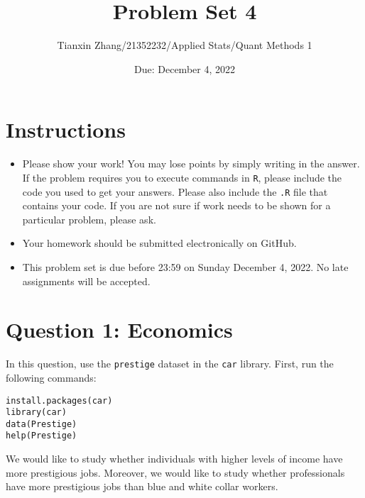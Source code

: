 \documentclass[12pt,letterpaper]{article}
\title{Problem Set 4}
\date{Due: December 4, 2022}
\author{Tianxin Zhang/21352232/Applied Stats/Quant Methods 1}
\begin{document}
	\maketitle
	\section*{Instructions}
	\begin{itemize}
		\item Please show your work! You may lose points by simply writing in the answer. If the problem requires you to execute commands in \texttt{R}, please include the code you used to get your answers. Please also include the \texttt{.R} file that contains your code. If you are not sure if work needs to be shown for a particular problem, please ask.
		\item Your homework should be submitted electronically on GitHub.
		\item This problem set is due before 23:59 on Sunday December 4, 2022. No late assignments will be accepted.
	\end{itemize}



	\vspace{.5cm}
\section*{Question 1: Economics}
\vspace{.25cm}
\noindent 	
In this question, use the \texttt{prestige} dataset in the \texttt{car} library. First, run the following commands:

\begin{verbatim}
install.packages(car)
library(car)
data(Prestige)
help(Prestige)
\end{verbatim} 


\noindent We would like to study whether individuals with higher levels of income have more prestigious jobs. Moreover, we would like to study whether professionals have more prestigious jobs than blue and white collar workers.
\end{document}
